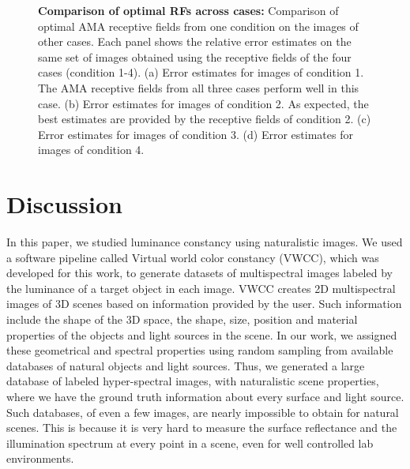 \documentclass{jov}
\begin{document}
\begin{figure}
\begin{subfigure}{0.22 \textwidth}
	\label{fig:case4Bar}
    \end{subfigure}
\caption{{\bf Comparison of optimal RFs across cases:} Comparison of optimal AMA receptive fields from one condition on the images of other cases. Each panel shows the relative error estimates on the same set of images obtained using the receptive fields of the four cases (condition 1-4). (a) Error estimates for images of condition 1. The AMA receptive fields from all three cases perform well in this case. (b) Error estimates for images of condition 2. As expected, the best estimates are provided by the receptive fields of condition 2. (c) Error estimates for images of condition 3. (d) Error estimates for images of condition 4.}
 \label{fig:barGraphs}
\end{figure}

\section{Discussion} \label{Discussion}
In this paper, we studied luminance constancy using naturalistic images. We used a software pipeline called  Virtual world color constancy (VWCC), which was developed for this work, to generate datasets of multispectral images labeled by the luminance of a target object in each image. VWCC creates 2D multispectral images of 3D scenes based on information provided by the user. Such information include the shape of the 3D space, the shape, size, position and material properties of the objects and light sources in the scene. In our work, we assigned these geometrical and spectral properties using random sampling from available databases of natural objects and light sources. Thus, we generated a large database of labeled hyper-spectral images, with naturalistic scene properties, where we have the ground truth information about every surface and light source. Such databases, of even a few images, are nearly impossible to obtain for natural scenes. This is because it is very hard to measure the surface reflectance and the illumination spectrum at every point in a scene, even for well controlled lab environments. 
\end{document}
